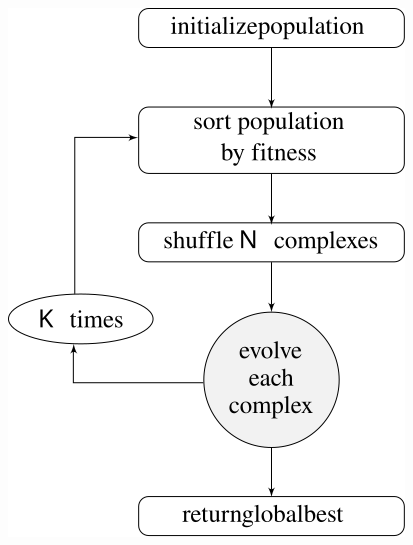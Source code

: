 \documentclass[a0,portrait]{a0poster}
\begin{document}
\begin{multicols}{2}
\begin{center}
\begin{minipage}{0.30\linewidth}
  \centering
  \includegraphics[scale=1.5]{flow1}
  \label{fig:flow1}
\end{minipage}
\begin{minipage}{0.30\linewidth}

\end{minipage}
\end{center}
\end{multicols}
\end{document}
